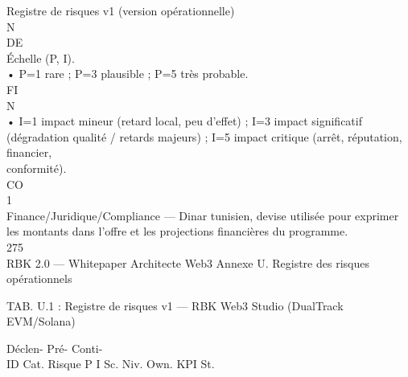 Registre de risques v1 (version opérationnelle)\\
\vspace{0.5em}
\vspace{0.5em}
\vspace{0.5em}
\vspace{0.5em}
N\\
DE\\
Échelle (P, I).\\
• P=1 rare ; P=3 plausible ; P=5 très probable.\\
\vspace{0.5em}
\vspace{0.5em}
\vspace{0.5em}
\vspace{0.5em}
FI\\
N\\
• I=1 impact mineur (retard local, peu d’effet) ; I=3 impact significatif (dégradation qualité / retards majeurs) ; I=5 impact critique (arrêt, réputation, financier,\\
conformité).\\
CO\\
\vspace{0.5em}
\vspace{0.5em}
\vspace{0.5em}
\vspace{0.5em}
1\\
Finance/Juridique/Compliance — Dinar tunisien, devise utilisée pour exprimer les montants dans l’offre et les projections financières du programme.\\
\vspace{0.5em}
\vspace{0.5em}
275\\
RBK 2.0 — Whitepaper Architecte Web3                                                                                                           Annexe U. Registre des risques opérationnels\\
\vspace{0.5em}
\vspace{0.5em}
\vspace{0.5em}
\vspace{0.5em}
\begin{center}\begin{tabular}TAB. U.1 : Registre de risques v1 — RBK Web3 Studio (DualTrack EVM/Solana)\end{tabular}\end{center}
Déclen-          Pré-              Conti-\\
ID     Cat.     Risque          P I Sc. Niv. Own.                                                            KPI            St.\\
